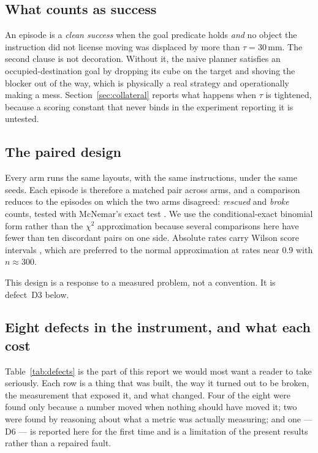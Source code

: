 \documentclass[11pt,a4paper]{article}
\newcommand{\defect}[1]{\textsc{#1}}
\begin{document}
\subsection{What counts as success}
An episode is a \emph{clean success} when the goal predicate holds \emph{and} no
object the instruction did not license moving was displaced by more than
$\tau = 30$\,mm. The second clause is not decoration. Without it, the naive
planner satisfies an occupied-destination goal by dropping its cube on the
target and shoving the blocker out of the way, which is physically a real
strategy and operationally making a mess. Section~\ref{sec:collateral} reports
what happens when $\tau$ is tightened, because a scoring constant that never
binds in the experiment reporting it is untested.

\subsection{The paired design}
Every arm runs the same layouts, with the same instructions, under the same
seeds. Each episode is therefore a matched pair across arms, and a comparison
reduces to the episodes on which the two arms disagreed: \emph{rescued} and
\emph{broke} counts, tested with McNemar's exact test
\citep{mcnemar1947note}. We use the conditional-exact binomial form rather than
the $\chi^2$ approximation because several comparisons here have fewer than ten
discordant pairs on one side. Absolute rates carry Wilson score intervals
\citep{wilson1927probable,brown2001interval}, which are preferred to the normal
approximation at rates near 0.9 with $n\approx300$.

This design is a response to a measured problem, not a convention. It is
defect~\defect{D3} below.

\subsection{Eight defects in the instrument, and what each cost}
\label{sec:defects}

Table~\ref{tab:defects} is the part of this report we would most want a reader to
take seriously. Each row is a thing that was built, the way it turned out to be
broken, the measurement that exposed it, and what changed. Four of the eight were
found only because a number moved when nothing should have moved it; two were
found by reasoning about what a metric was actually measuring; and one ---
\defect{D6} --- is reported here for the first time and is a limitation of the
present results rather than a repaired fault.
\end{document}
